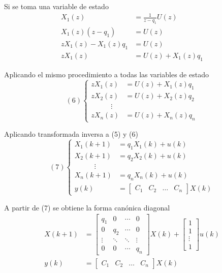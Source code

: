 Si se toma una variable de estado
\[
    \begin{split}
        X_{1}(z) & = \frac{ 1 }{ z-q_{1} }U(z) \\
        X_{1}(z)(z-q_{1}) & = U(z) \\
        zX_{1}(z) - X_{1}(z)q_{1} & = U(z) \\
        zX_{1}(z) & = U(z) + X_{1}(z)q_{1}
    \end{split}
\]

Aplicando el mismo procedimiento a todas las variables de estado
\[(6)
    \left\{
        \begin{array}{lll}
            zX_{1}(z) & = U(z) + X_{1}(z)q_{1} \\ 
            zX_{2}(z) & = U(z) + X_{2}(z)q_{2} \\
            \;\;\;\;\;\;\;\;\;\; \vdots \\
            zX_{n}(z) & = U(z) + X_{n}(z)q_{n}
        \end{array}
    \right.
\]

Aplicando transformada inversa a (5) y (6)
\[(7)
    \left\{
        \begin{array}{lll}
            X_{1}(k+1) & = q_{1}X_{1}(k) + u(k) \\ 
            X_{2}(k+1) & = q_{2}X_{2}(k) + u(k) \\
            \;\;\;\;\;\;\;\;\;\; \vdots \\
            X_{n}(k+1) & = q_{n}X_{n}(k) + u(k) \\
            y(k) & = 
            \begin{bmatrix}
                C_{1} & C_{2} & \ldots & C_{n} 
            \end{bmatrix} X(k)
        \end{array}
    \right.
\]

A partir de (7) se obtiene la forma canónica diagonal
\[
    \begin{split}
        X(k+1) & = 
        \begin{bmatrix}
            q_{1} & 0 & \cdots & 0 \\
            0 & q_{2} & \cdots & 0 \\
            \vdots & \ddots & \ddots & \vdots \\
            0 & 0 & \cdots & q_{n}
        \end{bmatrix}X(k) +
        \begin{bmatrix}
            1 \\ 1 \\ \vdots \\ 1
        \end{bmatrix}u(k) \\
        y(k) & = 
        \begin{bmatrix}
            C_{1} & C_{2} & \ldots & C_{n}   
        \end{bmatrix} X(k)
    \end{split}
\]